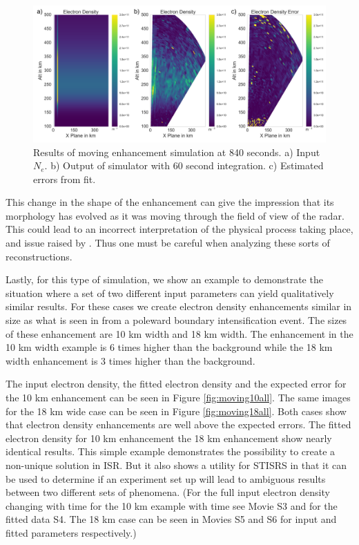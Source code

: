 \documentclass[draft,ras]{agutex}
\begin{document}
\begin{article}
\begin{figure}[!t]
\centering
\includegraphics[width=6in]{moving14mins}
\caption{Results of moving enhancement simulation at 840 seconds. a) Input $N_e$. b) Output of simulator with 60 second integration. c) Estimated errors from fit.}
\label{fig:moving14mins}
\end{figure}

This change in the shape of the enhancement can give the impression that its morphology has evolved as it was moving through the field of view of the radar. This could lead to an incorrect interpretation of the physical process taking place, and issue raised by \citet{Dahlgren:2012dq}.   Thus one must be careful when analyzing these sorts of reconstructions.

Lastly, for this type of simulation, we show an example to demonstrate the situation where a set of two different input parameters can yield qualitatively similar results. For these cases we create electron density enhancements similar in size as what is seen in \citet{Semeter:2005fo} from a poleward boundary intensification event. The sizes of these enhancement are 10 km width and 18 km width. The enhancement in the 10 km width example is 6 times higher than the background while the 18 km width enhancement is 3 times higher than the background.

The input electron density, the fitted electron density and the expected error for the 10 km enhancement can be seen in Figure \ref{fig:moving10all}. The same images for the 18 km wide case can be seen in Figure \ref{fig:moving18all}. Both cases show that electron density enhancements are well above the expected errors. The fitted electron density for 10 km enhancement the 18 km enhancement show nearly identical results. This simple example demonstrates the possibility to create a non-unique solution in ISR. But it also shows a utility for STISRS in that it can be used to determine if an experiment set up will lead to ambiguous results between two different sets of phenomena. (For the full input electron density changing with time for the 10 km example with time see Movie S3 and for the fitted data S4. The 18 km case can be seen in Movies S5 and S6 for input and fitted parameters respectively.)


\end{article}
\end{document}
